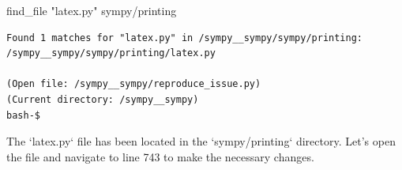 {\begin{agentbox}
\hrulefill
\begin{CodeVerbatim}[breaklines=true, breakanywhere=true]
find_file "latex.py" sympy/printing
\end{CodeVerbatim}
\end{agentbox}
\begin{observationbox}\begin{Verbatim}[breaklines=true, breakanywhere=true]
Found 1 matches for "latex.py" in /sympy__sympy/sympy/printing:
/sympy__sympy/sympy/printing/latex.py

(Open file: /sympy__sympy/reproduce_issue.py)
(Current directory: /sympy__sympy)
bash-$
\end{Verbatim}
\end{observationbox}
\begin{agentbox}
The `latex.py` file has been located in the `sympy/printing` directory. Let's open the file and navigate to line 743 to make the necessary changes.




\end{agentbox}}
